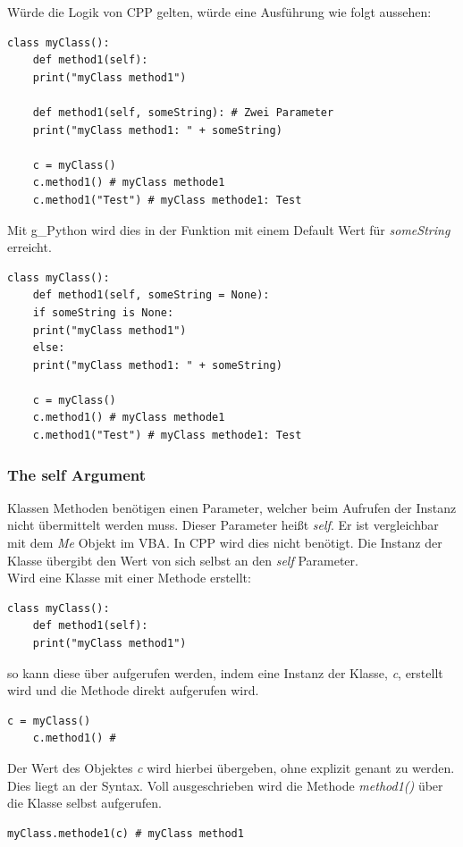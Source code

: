 Würde die Logik von \gls{CPP} gelten, würde eine Ausführung wie folgt aussehen:
\begin{lstlisting}[style=python]
	class myClass():
	def method1(self):
	print("myClass method1")
	
	def method1(self, someString): # Zwei Parameter
	print("myClass method1: " + someString)	
	
	c = myClass()
	c.method1() # myClass methode1
	c.method1("Test") # myClass methode1: Test
\end{lstlisting}

Mit \gls{g_Python} wird dies in der Funktion mit einem Default Wert für \textit{someString} erreicht.
\begin{lstlisting}[style=python]
	class myClass():
	def method1(self, someString = None):
	if someString is None:
	print("myClass method1")
	else:
	print("myClass method1: " + someString)	
	
	c = myClass()
	c.method1() # myClass methode1
	c.method1("Test") # myClass methode1: Test
\end{lstlisting}

\subsubsection{The self Argument}
Klassen Methoden benötigen einen Parameter, welcher beim Aufrufen der Instanz nicht übermittelt werden muss. Dieser Parameter heißt \textit{self}. Er ist vergleichbar mit dem \textit{Me} Objekt im \gls{VBA}. In \gls{CPP} wird dies nicht benötigt. 
Die Instanz der Klasse übergibt den Wert von sich selbst an den \textit{self} Parameter. \\

Wird eine Klasse mit einer Methode erstellt:
\begin{lstlisting}[style=python]
	class myClass():
	def method1(self):
	print("myClass method1")
\end{lstlisting}
so kann diese über aufgerufen werden, indem eine Instanz der Klasse, \textit{c}, erstellt wird und die Methode direkt aufgerufen wird.
\begin{lstlisting}[style=python]
	c = myClass()
	c.method1() #
\end{lstlisting}
Der Wert des Objektes \textit{c} wird hierbei übergeben, ohne explizit genant zu werden.
Dies liegt an der Syntax. Voll ausgeschrieben wird die Methode \textit{method1()} über die Klasse selbst aufgerufen.
\begin{lstlisting}[style=python]
	myClass.methode1(c) # myClass method1
\end{lstlisting}


